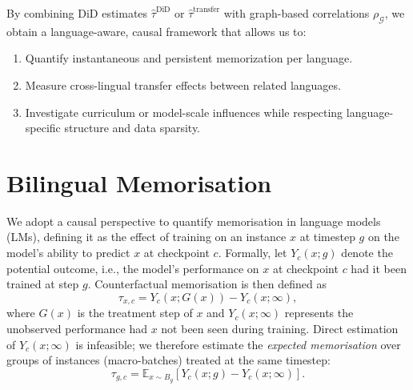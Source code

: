 By combining DiD estimates $\hat{\tau}^{\text{DiD}}$ or $\hat{\tau}^{\text{transfer}}$ with graph-based correlations $\rho_\mathcal{G}$, we obtain a language-aware, causal framework that allows us to:  

\begin{enumerate}
    \item Quantify instantaneous and persistent memorization per language.
    \item Measure cross-lingual transfer effects between related languages.
    \item Investigate curriculum or model-scale influences while respecting language-specific structure and data sparsity.
\end{enumerate}
 
\section{Bilingual Memorisation}


We adopt a causal perspective to quantify memorisation in language models (LMs), defining it as the effect of training on an instance $x$ at timestep $g$ on the model's ability to predict $x$ at checkpoint $c$. Formally, let $Y_c(x; g)$ denote the potential outcome, i.e., the model's performance on $x$ at checkpoint $c$ had it been trained at step $g$. Counterfactual memorisation is then defined as
\begin{equation}
\tau_{x,c} = Y_c(x; G(x)) - Y_c(x; \infty),
\end{equation}
where $G(x)$ is the treatment step of $x$ and $Y_c(x; \infty)$ represents the unobserved performance had $x$ not been seen during training. Direct estimation of $Y_c(x; \infty)$ is infeasible; we therefore estimate the \emph{expected memorisation} over groups of instances (macro-batches) treated at the same timestep:
\begin{equation}
\tau_{g,c} = \mathbb{E}_{x \sim B_g}[Y_c(x; g) - Y_c(x; \infty)].
\end{equation}

